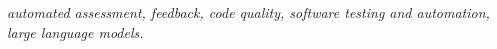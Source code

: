 \documentclass[conference]{IEEEtran}
\newcommand{\codeinspector}{\textit{CodeInspector}\ }
\newcommand{\codeinspectoren}{\textit{CodeInspector}}
\begin{document}
\maketitle

\begin{abstract}
\end{abstract}

\begin{IEEEkeywords}
\textit{automated assessment, feedback, code quality, software testing and automation, large language models.}
\end{IEEEkeywords}







\end{document}
